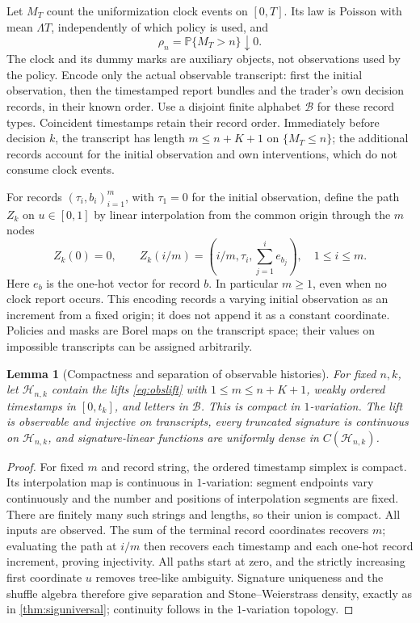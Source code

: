 \documentclass[11pt]{article}
\numberwithin{equation}{section}
\newtheorem{lemma}[theorem]{Lemma}
\theoremstyle{definition}
\theoremstyle{remark}
\theoremstyle{definition}
\newcommand{\Pp}{\mathbb P}
\begin{document}
Let $M_T$ count the uniformization clock events on $[0,T]$. Its law is
Poisson with mean $\Lambda T$, independently of which policy is used, and
\begin{equation}\label{eq:clocktail}
 \rho_n=\Pp\{M_T>n\}\downarrow0.
\end{equation}
The clock and its dummy marks are auxiliary objects, not observations used
by the policy. Encode only the actual observable transcript: first the
initial observation, then the timestamped report bundles and the trader's
own decision records, in their known order. Use a disjoint finite alphabet
$\mathcal B$ for these record types. Coincident timestamps retain their
record order. Immediately before decision $k$, the transcript has length
$m\le n+K+1$ on $\{M_T\le n\}$; the additional records account for the
initial observation and own interventions, which do not consume clock events.

For records $(\tau_i,b_i)_{i=1}^m$, with $\tau_1=0$ for the initial
observation, define the path $Z_k$ on $u\in[0,1]$ by linear interpolation
from the common origin through the $m$ nodes
\begin{equation}\label{eq:obslift}
 Z_k(0)=0,\qquad
 Z_k(i/m)=\left(i/m,\tau_i,\sum_{j=1}^i e_{b_j}\right),
 \quad 1\le i\le m.
\end{equation}
Here $e_b$ is the one-hot vector for record $b$. In particular $m\ge1$,
even when no clock report occurs. This encoding records a varying initial
observation as an increment from a fixed origin; it does not append it as
a constant coordinate. Policies and masks are Borel maps on the transcript
space; their values on impossible transcripts can be assigned arbitrarily.

\begin{lemma}[Compactness and separation of observable histories]
\label{lem:compacthist}
For fixed $n,k$, let $\mathcal H_{n,k}$ contain the lifts
\eqref{eq:obslift} with $1\le m\le n+K+1$, weakly ordered timestamps in
$[0,t_k]$, and letters in $\mathcal B$. This is compact in $1$-variation.
The lift is observable and injective on transcripts, every truncated
signature is continuous on $\mathcal H_{n,k}$, and signature-linear
functions are uniformly dense in $C(\mathcal H_{n,k})$.
\end{lemma}
\begin{proof}
For fixed $m$ and record string, the ordered timestamp simplex is compact.
Its interpolation map is continuous in $1$-variation: segment endpoints
vary continuously and the number and positions of interpolation segments
are fixed. There are finitely many such strings and lengths, so their
union is compact. All inputs are observed. The sum of the terminal record
coordinates recovers $m$; evaluating the path at $i/m$ then recovers each
timestamp and each one-hot record increment, proving injectivity.
All paths start at zero, and the strictly increasing first coordinate $u$
removes tree-like ambiguity. Signature uniqueness and the shuffle algebra
therefore give separation and Stone--Weierstrass density, exactly as in
\cref{thm:siguniversal}; continuity follows in the $1$-variation topology.
\end{proof}
\end{document}
